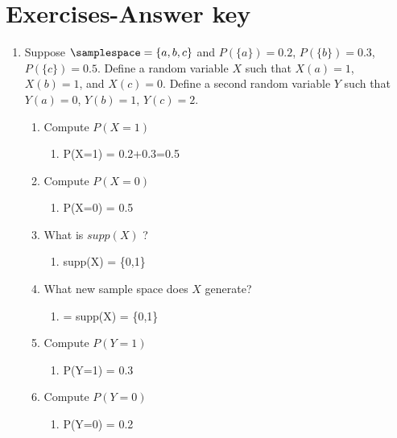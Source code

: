 \documentclass[krantz1,ChapterTOCs]{krantz}
\begin{document}
\section{Exercises-Answer key}

\begin{enumerate}
    \item Suppose $\samplespace = \{ a,b,c \}$ and $P(\{a\})=0.2$, $P(\{b\})=0.3$, $P(\{c\})=0.5$. Define a random variable $X$ such that $X(a)=1$, $X(b)=1$, and $X(c)=0$.
    Define a second random variable $Y$ such that $Y(a)=0$, $Y(b) = 1$, $Y(c)=2$.
    \begin{enumerate}
        \item Compute $P(X=1)$
        \begin{enumerate}
            \item {\color{red} P(X=1) = 0.2+0.3=0.5   }
        \end{enumerate}
        
        \item Compute $P(X=0)$
        \begin{enumerate}
            \item {\color{red} P(X=0) = 0.5   }
        \end{enumerate}
        
        \item What is $supp(X)$ ? 
        \begin{enumerate}
            \item {\color{red} supp(X) = \{0,1\}   }
        \end{enumerate}
        
        \item What new sample space does $X$ generate?
        \begin{enumerate}
            \item {\color{red}  = supp(X) = \{0,1\}   }
        \end{enumerate}

        \item Compute $P(Y=1)$
        \begin{enumerate}
            \item {\color{red} P(Y=1) = 0.3   }
        \end{enumerate}

        \item Compute $P(Y=0)$
        \begin{enumerate}
            \item {\color{red} P(Y=0) = 0.2   }
        \end{enumerate}
        

\end{enumerate}
\end{enumerate}
\end{document}

